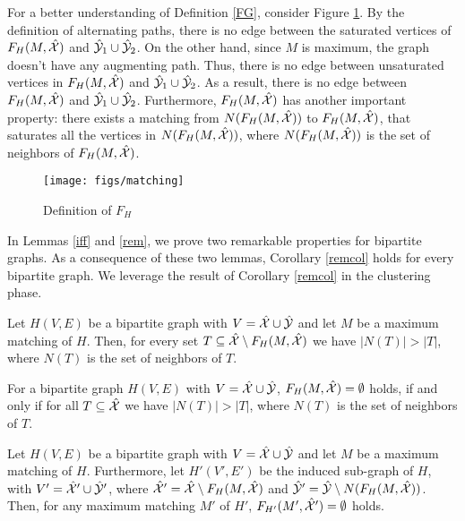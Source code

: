 For a better understanding of Definition \ref{FG}, consider Figure \ref{fig:FG}. By the definition of alternating paths, there is no edge between the saturated vertices of $F_H(M,\hat{\mathcal{X}})$ and $ \hat{\mathcal{Y}}_1 \cup \hat{\mathcal{Y}}_2$. On the other hand, since $M$ is maximum, the graph doesn't have any augmenting path. Thus, there is no edge between unsaturated vertices in $F_H(M,\hat{\mathcal{X}})$ and $ \hat{\mathcal{Y}}_1 \cup \hat{\mathcal{Y}}_2$. As a result, there is no edge between $F_H(M,\hat{\mathcal{X}})$ and $ \hat{\mathcal{Y}}_1 \cup \hat{\mathcal{Y}}_2$. Furthermore, $F_H(M,\hat{\mathcal{X}})$ has another important property: there exists a matching from $N(F_H(M,\hat{\mathcal{X}}))$ to $F_H(M,\hat{\mathcal{X}})$, that saturates all the vertices in $N(F_H(M,\hat{\mathcal{X}}))$, where $N(F_H(M,\hat{\mathcal{X}}))$ is the set of neighbors of  $F_H(M,\hat{\mathcal{X}})$.

\begin{figure}
\centering
\texttt{[image: figs/matching]}
\caption{Definition of $F_H$}
\label{fig:FG}
\end{figure}

In Lemmas \ref{iff} and \ref{rem}, we prove two remarkable properties for bipartite graphs. As a consequence of these two lemmas, Corollary \ref{remcol} holds for every bipartite graph. We leverage the result of Corollary \ref{remcol} in the clustering phase.
 
\begin{lemma}
\label{rem}
Let $H(V,E)$ be a bipartite graph with $V = \hat{\mathcal{X}} \cup \hat{\mathcal{Y}}$ and let $M$ be a maximum matching of $H$. Then, for every set $T \subseteq \hat{\mathcal{X}} \setminus F_H(M,\hat{\mathcal{X}})$ we have $|N(T)| > |T|$, where $N(T)$ is the set of neighbors of $T$. 
\end{lemma}

\begin{lemma}
\label{iff}
For a bipartite graph $H(V,E)$ with $V = \hat{\mathcal{X}} \cup \hat{\mathcal{Y}}$, $F_H(M,\hat{\mathcal{X}}) = \emptyset$ holds, if and only if
for all $T \subseteq \hat{\mathcal{X}}$ we have  $|N(T)| > |T|$, where $N(T)$ is the set of neighbors of $T$.

\end{lemma}

\begin{corollary}
\label{remcol}
Let $H(V,E)$ be a bipartite graph with $V = \hat{\mathcal{X}} \cup \hat{\mathcal{Y}}$ and let $M$ be a maximum matching of $H$. 
Furthermore, let  $H'(V',E')$ be the induced sub-graph of $H$, with $V' = \hat{\mathcal{X}}' \cup \hat{\mathcal{Y}}'$, where $\hat{\mathcal{X}}' = \hat{\mathcal{X}} \setminus F_H(M,\hat{\mathcal{X}})$ and $\hat{\mathcal{Y}}' = \hat{\mathcal{Y}} \setminus N(F_H(M,\hat{\mathcal{X}}))$. Then, for any maximum matching $M'$ of $H'$, $F_{H'}(M',\hat{\mathcal{X}}') = \emptyset$ holds. 
\end{corollary}
